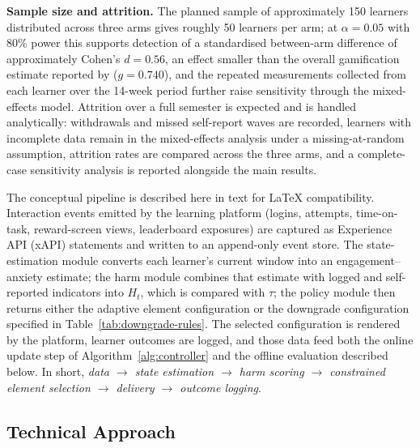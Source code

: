 \documentclass[12pt,a4paper]{article}
\begin{document}
\begin{justify}
\textbf{Sample size and attrition.} The planned sample of approximately 150 learners
distributed across three arms gives roughly 50 learners per arm; at $\alpha = 0.05$
with 80\% power this supports detection of a standardised between-arm difference of
approximately Cohen's $d = 0.56$, an effect smaller than the overall gamification
estimate reported by \textcite{lu2024ai} ($g = 0.740$), and the repeated
measurements collected from each learner over the 14-week period further raise
sensitivity through the mixed-effects model. Attrition over a full semester is
expected and is handled analytically: withdrawals and missed self-report waves are
recorded, learners with incomplete data remain in the mixed-effects analysis under a
missing-at-random assumption, attrition rates are compared across the three arms, and
a complete-case sensitivity analysis is reported alongside the main results.

The conceptual pipeline is described here in text for LaTeX compatibility. Interaction events
emitted by the learning platform (logins, attempts, time-on-task, reward-screen views, leaderboard
exposures) are captured as Experience API (xAPI) statements and written to an append-only event store. The
state-estimation module converts each learner's current window into an engagement--anxiety
estimate; the harm module combines that estimate with logged and self-reported indicators into
$H_t$, which is compared with $\tau$; the policy module then returns either the adaptive element
configuration or the downgrade configuration specified in Table~\ref{tab:downgrade-rules}. The
selected configuration is rendered by the platform, learner outcomes are logged, and those data
feed both the online update step of Algorithm~\ref{alg:controller} and the offline evaluation
described below. In short, \emph{data $\rightarrow$ state estimation $\rightarrow$ harm scoring
$\rightarrow$ constrained element selection $\rightarrow$ delivery $\rightarrow$ outcome logging}.

\subsection{Technical Approach}


\end{justify}
\end{document}
